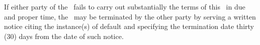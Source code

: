 If either party of the \parties\ fails to carry out substantially the terms of this \amendmentTitle\ in due and proper time, the \amendmentTitle\ may be terminated by the other party by serving a written notice citing the instance(s) of default and specifying the termination date thirty (30) days from the date of such notice.
